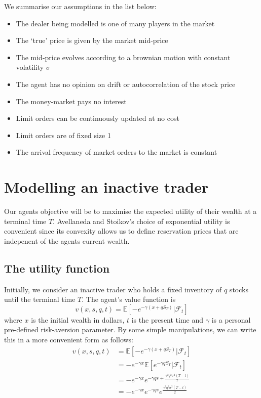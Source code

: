 We summarise our assumptions in the list below:

\begin{itemize}
    \item The dealer being modelled is one of many players in the market
    \item The `true' price is given by the market mid-price
    \item The mid-price evolves according to a brownian motion with constant volatility $\sigma$
    \item The agent has no opinion on drift or autocorrelation of the stock price
    \item The money-market pays no interest
    \item Limit orders can be continuously updated at no cost
    \item Limit orders are of fixed size 1
    \item The arrival frequency of market orders to the market is constant
\end{itemize}

\section{Modelling an inactive trader}\label{sec:3.3}

Our agents objective will be to maximise the expected utility of their wealth at 
a terminal time $T$. Avellaneda and Stoikov's choice of exponential utility is 
convenient since its convexity allows us to define reservation prices that are 
indepenent of the agents current wealth.

\subsection*{The utility function}

Initially, we consider an inactive trader who holds a fixed inventory of $q$ stocks 
until the terminal time $T.$ The agent's value function is
\begin{equation}\label{eq:3.1}
    v(x,s,q,t)=\mathbb{E}\left[-e^{-\gamma(x+qS_T)}|\mathcal{F}_t\right]
\end{equation}
where $x$ is the initial wealth in dollars, $t$ is the present time and $\gamma$ is 
a personal pre-defined risk-aversion parameter. By some simple manipulations, we can 
write this in a more convenient form as follows:
\begin{align*}
    v(x,s,q,t)&=\mathbb{E}\left[-e^{-\gamma(x+qS_T)}|\mathcal{F}_t\right]\\
    &=-e^{-\gamma x}\mathbb{E}\left[e^{-\gamma q S_T}|\mathcal{F}_t\right]\\
    &=-e^{-\gamma x}e^{-\gamma q s + \frac{\gamma^2q^2\sigma^2(T-t)}{2}}\\
    &=-e^{-\gamma x}e^{-\gamma q s}e^{\frac{\gamma^2q^2\sigma^2(T-t)}{2}}
\end{align*}

